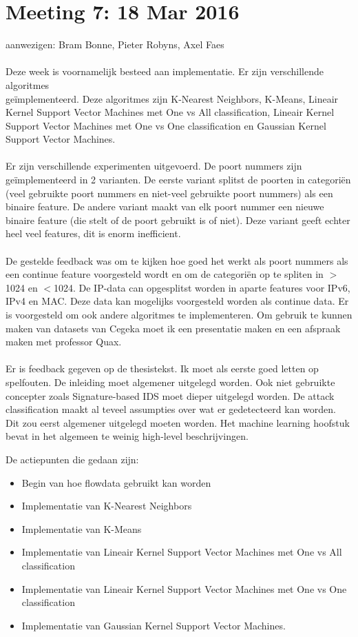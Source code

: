 \section{Meeting 7: 18 Mar 2016}
aanwezigen: Bram Bonne, Pieter Robyns, Axel Faes\\\\
Deze week is voornamelijk besteed aan implementatie. Er zijn verschillende algoritmes \\ge\"implementeerd. Deze algoritmes zijn K-Nearest Neighbors, K-Means, Lineair Kernel Support Vector Machines met One vs All classification, Lineair Kernel Support Vector Machines met One vs One classification en Gaussian Kernel Support Vector Machines. \\
\\
Er zijn verschillende experimenten uitgevoerd. De poort nummers zijn ge\"implementeerd in 2 varianten. De eerste variant splitst de poorten in categori\"en (veel gebruikte poort nummers en niet-veel gebruikte poort nummers) als een binaire feature. De andere variant maakt van elk poort nummer een nieuwe binaire feature (die stelt of de poort gebruikt is of niet). Deze variant geeft echter heel veel features, dit is enorm inefficient. \\
\\
De gestelde feedback was om te kijken hoe goed het werkt als poort nummers als een continue feature voorgesteld wordt en om de categori\"en op te spliten in $>$1024 en $<$1024. De IP-data can opgesplitst worden in aparte features voor IPv6, IPv4 en MAC. Deze data kan mogelijks voorgesteld worden als continue data. Er is voorgesteld om ook andere algoritmes te implementeren. Om gebruik te kunnen maken van datasets van Cegeka moet ik een presentatie maken en een afspraak maken met professor Quax. \\
\\
Er is feedback gegeven op de thesistekst. Ik moet als eerste goed letten op spelfouten. De inleiding moet algemener uitgelegd worden. Ook niet gebruikte concepter zoals Signature-based IDS moet dieper uitgelegd worden. De attack classification maakt al teveel assumpties over wat er gedetecteerd kan worden. Dit zou eerst algemener uitgelegd moeten worden. Het machine learning hoofstuk bevat in het algemeen te weinig high-level beschrijvingen. 

De actiepunten die gedaan zijn:
\begin{itemize}  
		\item Begin van hoe flowdata gebruikt kan worden
        \item Implementatie van K-Nearest Neighbors
        \item Implementatie van K-Means
        \item Implementatie van Lineair Kernel Support Vector Machines met One vs All classification
        \item Implementatie van Lineair Kernel Support Vector Machines met One vs One classification
        \item Implementatie van Gaussian Kernel Support Vector Machines.
\end{itemize}

